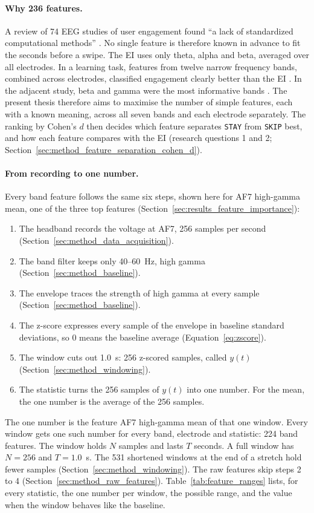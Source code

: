 \documentclass[12pt,a4paper]{report}
\begin{document}
\paragraph{Why 236 features.} A review of 74 EEG studies of user engagement found ``a lack of standardized computational methods'' \cite{bellos_methods_2025}. No single feature is therefore known in advance to fit the seconds before a swipe. The EI uses only theta, alpha and beta, averaged over all electrodes. In a learning task, features from twelve narrow frequency bands, combined across electrodes, classified engagement clearly better than the EI \cite{apicella_eeg-based_2022}. In the adjacent study, beta and gamma were the most informative bands \cite{rahman_detection_2025}. The present thesis therefore aims to maximise the number of simple features, each with a known meaning, across all seven bands and each electrode separately. The ranking by Cohen's \(d\) then decides which feature separates \texttt{STAY} from \texttt{SKIP} best, and how each feature compares with the EI (research questions 1 and 2; Section~\ref{sec:method_feature_separation_cohen_d}).

\paragraph{From recording to one number.} Every band feature follows the same six steps, shown here for AF7 high-gamma mean, one of the three top features (Section~\ref{sec:results_feature_importance}):
\begin{enumerate}
    \item The headband records the voltage at AF7, 256 samples per second (Section~\ref{sec:method_data_acquisition}).
    \item The band filter keeps only 40--60~Hz, high gamma (Section~\ref{sec:method_baseline}).
    \item The envelope traces the strength of high gamma at every sample (Section~\ref{sec:method_baseline}).
    \item The z-score expresses every sample of the envelope in baseline standard deviations, so 0 means the baseline average (Equation~\ref{eq:zscore}).
    \item The window cuts out 1.0~s: 256 z-scored samples, called \(y(t)\) (Section~\ref{sec:method_windowing}).
    \item The statistic turns the 256 samples of \(y(t)\) into one number. For the mean, the one number is the average of the 256 samples.
\end{enumerate}
The one number is the feature AF7 high-gamma mean of that one window. Every window gets one such number for every band, electrode and statistic: 224 band features. The window holds \(N\) samples and lasts \(T\) seconds. A full window has \(N = 256\) and \(T = 1.0\)~s. The 531 shortened windows at the end of a stretch hold fewer samples (Section~\ref{sec:method_windowing}). The raw features skip steps 2 to 4 (Section~\ref{sec:method_raw_features}). Table~\ref{tab:feature_ranges} lists, for every statistic, the one number per window, the possible range, and the value when the window behaves like the baseline.
\end{document}
